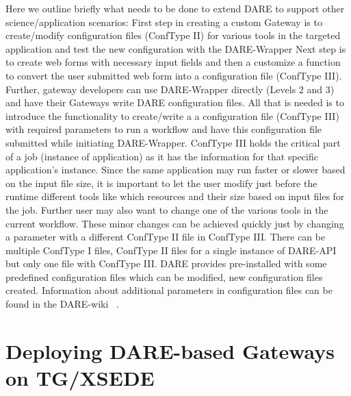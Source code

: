 \documentclass[]{svjour3}
\begin{document}
Here we outline briefly what needs to be done to extend DARE to
support other science/application scenarios: First step in creating a
custom Gateway is to create/modify configuration files (ConfType II)
for various tools in the targeted application and test the new
configuration with the DARE-Wrapper Next step is to create web forms
with necessary input fields and then a customize a function to convert
the user submitted web form into a configuration file (ConfType III).
Further, gateway developers can use DARE-Wrapper directly (Levels 2
and 3) and have their Gateways write DARE configuration files.  All
that is needed is to introduce the functionality to create/write a a
configuration file (ConfType III) with required parameters to run a
workflow and have this configuration file submitted while initiating
DARE-Wrapper. ConfType III holds the critical part of a job (instance
of application) as it has the information for that specific
application's instance. Since the same application may run faster or
slower based on the input file size, it is important to let the user
modify just before the runtime different tools like which resources
and their size based on input files for the job. Further user may also
want to change one of the various tools in the current workflow. These
minor changes can be achieved quickly just by changing a parameter
with a different ConfType II file in ConfType III.  There can be
multiple ConfType I files, ConfType II files for a single instance of
DARE-API but only one file with ConfType III.  DARE provides
pre-installed with some predefined configuration files which can be
modified, new configuration files created. Information about
additional parameters in configuration files can be found in the
DARE-wiki ~\cite{dare_api_web}.




\section{Deploying DARE-based Gateways on TG/XSEDE}
\end{document}
